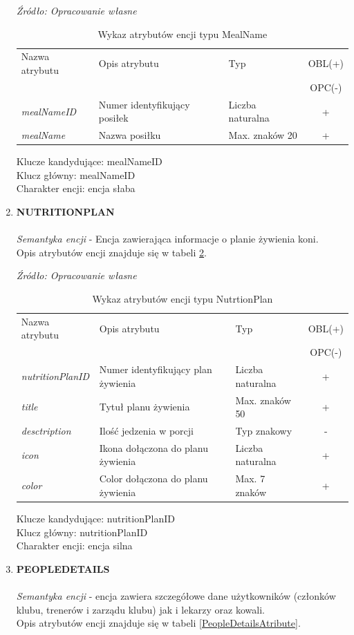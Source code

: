 \documentclass[12pt,oneside]{report}
\begin{document}
\begin{enumerate}[start=10,label={\bfseries ENC$\backslash$\arabic*}]
	\begin{table}[H]
		\caption{Wykaz atrybutów encji typu MealName }
		\textit{Źródło: Opracowanie własne}
		\label{MealNameAtribute}
		\centering
		\begin{tabular}{|l|l|l|c|}
			\hline
			Nazwa atrybutu & Opis atrybutu & Typ & OBL(+) \\
			& & &  OPC(-) \\
			\hline
			\textit{mealNameID} & Numer identyfikujący posiłek & Liczba naturalna & + \\
			\hline
			\textit{mealName} & Nazwa posiłku & Max. znaków 20 & + \\
			\hline
		\end{tabular}
	\end{table}
	Klucze kandydujące: mealNameID \\
	Klucz główny: mealNameID \\
	Charakter encji: encja słaba \\
\newpage
\item \textbf{NUTRITIONPLAN}
\\ \\
\textit{Semantyka encji} - Encja zawierająca informacje o planie żywienia koni.
		\\
Opis atrybutów encji znajduje się w tabeli \ref{NutritionPlanAtribute}.

\begin{table}[H]
	\caption{Wykaz atrybutów encji typu NutrtionPlan }
	\textit{Źródło: Opracowanie własne}
	\label{NutritionPlanAtribute}
	\centering
	\begin{tabular}{|l|l|l|c|}
		\hline
		Nazwa atrybutu & Opis atrybutu & Typ & OBL(+) \\
		& & &  OPC(-) \\
		\hline
		\textit{nutritionPlanID} & Numer identyfikujący plan żywienia & Liczba naturalna & + \\
		\hline
		\textit{title} &  Tytuł planu żywienia & Max. znaków 50 & + \\
		\hline
		\textit{desctription} &  Ilość jedzenia w porcji & Typ znakowy & - \\
		\hline
		\textit{icon} &  Ikona dołączona do planu żywienia & Liczba naturalna & + \\
		\hline		
		\textit{color} &  Color dołączona do planu żywienia & Max. 7 znaków & + \\
		\hline
	\end{tabular}
\end{table}
Klucze kandydujące: nutritionPlanID \\
Klucz główny: nutritionPlanID \\
Charakter encji: encja silna\\
	\item \textbf{PEOPLEDETAILS}\\ \\
	\textit{Semantyka encji} - encja zawiera szczegółowe dane użytkowników (członków klubu, trenerów i zarządu klubu) jak i lekarzy oraz kowali.
			\\ 
	Opis atrybutów encji znajduje się w tabeli \ref{PeopleDetailsAtribute}.
	

\end{enumerate}
\end{document}
